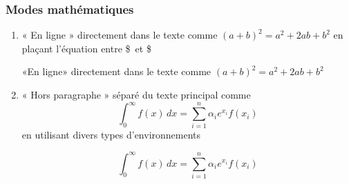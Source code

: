 \begin{frame}[fragile]

	\frametitle{Modes mathématiques}
	
	\begin{enumerate}
		\item « En ligne » directement dans le texte comme %
		$(a + b)^2 = a^2 + 2ab + b^2$ en plaçant l’équation entre \$\ et \$
			\begin{codesource}
	«En ligne» directement dans le texte comme $(a + b)^2 = a^2 + 2ab + b^2$
			\end{codesource}
		
		\item « Hors paragraphe » séparé du texte principal comme
		\begin{equation*}
			\int_0^\infty f(x)\, dx =
			\sum_{i = 1}^n \alpha_i e^{x_i} f(x_i)
		\end{equation*}
			en utilisant divers types d’environnements
			\begin{codesource}
	\begin{equation*}
		\int_0^\infty f(x)\, dx =
		\sum_{i = 1}^n \alpha_i e^{x_i} f(x_i)
	\end{equation*}	
			\end{codesource}
	\end{enumerate}
\end{frame}


